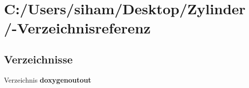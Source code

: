 \section{C:/Users/siham/Desktop/Zylinder/-Verzeichnisreferenz}
\label{dir_C_3A_2FUsers_2Fsiham_2FDesktop_2FZylinder_2F}


\subsection*{Verzeichnisse}
\begin{CompactItemize}
\item 
Verzeichnis {\bf doxygenoutout}
\end{CompactItemize}
